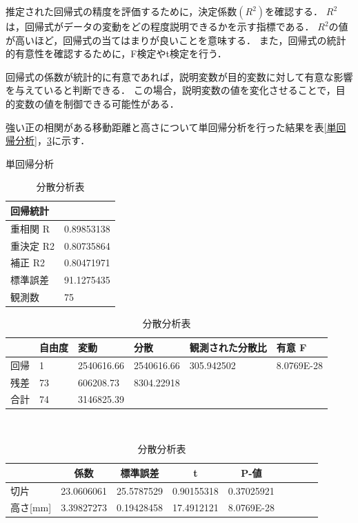 \documentclass[titlepage,a4paper]{jsarticle}
\begin{document}
推定された回帰式の精度を評価するために，決定係数$(R^{2})$を確認する．
$R^{2}$は，回帰式がデータの変動をどの程度説明できるかを示す指標である．
$R^{2}$の値が高いほど，回帰式の当てはまりが良いことを意味する．
また，回帰式の統計的有意性を確認するために，F検定やt検定を行う．

回帰式の係数が統計的に有意であれば，説明変数が目的変数に対して有意な影響を与えていると判断できる．
この場合，説明変数の値を変化させることで，目的変数の値を制御できる可能性がある．

強い正の相関がある移動距離と高さについて単回帰分析を行った結果を表\ref{単回帰分析}，\ref{分散}に示す．
\begin{table}[H]
  \centering
  \caption{単回帰分析}
  \label{単回帰分析}
  \begin{tabular}{l|l}
    \multicolumn{2}{l}{回帰統計} \\\hline\hline
    重相関 R  & 0.89853138      \\
    重決定 R2 & 0.80735864      \\
    補正 R2  & 0.80471971      \\
    標準誤差   & 91.1275435      \\
    観測数    & 75              \\\hline
  \end{tabular}
  \caption{分散分析表}
  \label{分散}
  \begin{tabular}{l|lllll}
       & 自由度 & 変動         & 分散         & 観測された分散比   & 有意 F       \\\hline\hline
    回帰 & 1   & 2540616.66 & 2540616.66 & 305.942502 & 8.0769E-28 \\
    残差 & 73  & 606208.73  & 8304.22918 &            &            \\
    合計 & 74  & 3146825.39 &            &            &            \\\hline
  \end{tabular}
  \\
  \begin{tabular}{l|llllllll}
    \multicolumn{1}{c|}{} & \multicolumn{1}{c}{係数} & \multicolumn{1}{c}{標準誤差} & \multicolumn{1}{c}{t} & \multicolumn{1}{c}{P-値} \\\hline\hline
    切片                    & 23.0606061             & 25.5787529               & 0.90155318            & 0.37025921              \\
    高さ{[}mm{]}            & 3.39827273             & 0.19428458               & 17.4912121            & 8.0769E-28              \\\hline
  \end{tabular}
\end{table}
\end{document}
